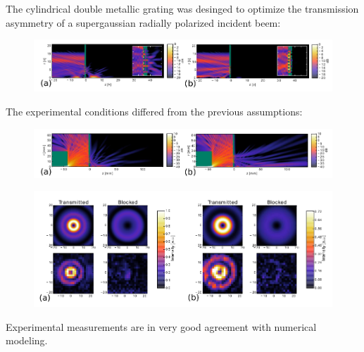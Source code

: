 \documentclass{beamer}
\begin{document}
\begin{frame}
	The cylindrical double metallic grating was desinged to optimize the transmission asymmetry of a supergaussian radially polarized incident beem:
	\begin{figure}
		\includegraphics[width=\textwidth]{../images/dmg/express_high_contrast.png}\\
	\end{figure}
	The experimental conditions differed from the previous assumptions:
	\begin{figure}
		\includegraphics[width=\textwidth]{../images/dmg/express_zarmata.png}\\
	\end{figure}
		
\end{frame}

\begin{frame}
	\begin{figure}
		\includegraphics[width=\textwidth]{../images/dmg/express_exp.png}\\
	\end{figure}
	Experimental measurements are in very good agreement with numerical modeling.
		
\end{frame}
\end{document}
